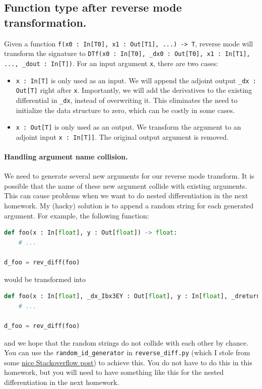 \subsection{Function type after reverse mode transformation.}
\label{sec:reversemodespec}

Given a function \lstinline{f(x0 : In[T0], x1 : Out[T1], ...) -> T}, reverse mode will transform the signature to \lstinline{DTf(x0 : In[T0], _dx0 : Out[T0], x1 : In[T1], ..., _dout : In[T])}. For an input argument \lstinline{x}, there are two cases:
\begin{itemize}
	\item \lstinline{x : In[T]} is only used as an input. We will append the adjoint output \lstinline{_dx : Out[T]} right after \lstinline{x}. Importantly, we will add the derivatives to the existing differential in \lstinline{_dx}, instead of overwriting it. This eliminates the need to initialize the data structure to zero, which can be costly in some cases.
	\item \lstinline{x : Out[T]} is only used as an output. We transform the argument to an adjoint input \lstinline{x : In[T]]}. The original output argument is removed.
\end{itemize}

\paragraph{Handling argument name collision.} We need to generate several new arguments for our reverse mode transform. It is possible that the name of these new argument collide with existing arguments. This can cause problems when we want to do nested differentiation in the next homework. My (hacky) solution is to append a random string for each generated argument. For example, the following function:
\begin{lstlisting}[language=Python]
def foo(x : In[float], y : Out[float]) -> float:
    # ...

d_foo = rev_diff(foo)
\end{lstlisting}
would be transformed into
\begin{lstlisting}[language=Python]
def foo(x : In[float], _dx_Ibx3EY : Out[float], y : In[float], _dreturn_W7TFYQ : In[float]):
    # ...

d_foo = rev_diff(foo)
\end{lstlisting}
and we hope that the random strings do not collide with each other by chance. You can use the \lstinline{random_id_generator} in \lstinline{reverse_diff.py} (which I stole from some \href{https://stackoverflow.com/questions/2257441/random-string-generation-with-upper-case-letters-and-digits}{nice Stackoverflow post}) to achieve this. You do not have to do this in this homework, but you will need to have something like this for the nested differentiation in the next homework.

